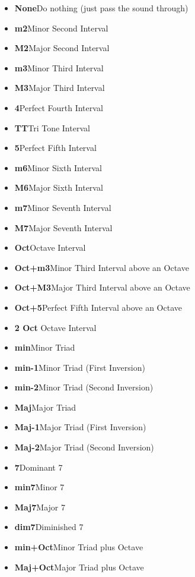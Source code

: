 \documentclass{article}
\begin{document}
{
\small
\begin{multicols}{2}
\begin{flushleft}
\begin{itemize}
\item {\bf None}\quad Do nothing (just pass the sound through)
\item {\bf m2}\quad Minor Second Interval
\item {\bf M2}\quad Major Second Interval
\item {\bf m3}\quad Minor Third Interval
\item {\bf M3}\quad Major Third Interval
\item {\bf 4}\quad Perfect Fourth Interval
\item {\bf TT}\quad Tri Tone Interval
\item {\bf 5}\quad Perfect Fifth Interval
\item {\bf m6}\quad Minor Sixth Interval
\item {\bf M6}\quad Major Sixth Interval
\item {\bf m7}\quad Minor Seventh Interval
\item {\bf M7}\quad Major Seventh Interval
\item {\bf Oct}\quad Octave Interval
\item {\bf Oct+m3}\quad Minor Third  Interval above an Octave
\item {\bf Oct+M3}\quad Major Third  Interval above an Octave
\item {\bf Oct+5}\quad Perfect Fifth  Interval above an Octave
\item {\bf 2 Oct} Octave Interval
\item {\bf min}\quad Minor Triad
\item {\bf min-1}\quad Minor Triad (First Inversion)
\item {\bf min-2}\quad Minor Triad (Second Inversion)
\item {\bf Maj}\quad Major Triad
\item {\bf Maj-1}\quad Major Triad (First Inversion)
\item {\bf Maj-2}\quad Major Triad (Second Inversion)
\item {\bf 7}\quad Dominant 7
\item {\bf min7}\quad Minor 7
\item {\bf Maj7}\quad Major 7
\item {\bf dim7}\quad Diminished 7
\item {\bf min+Oct}\quad Minor Triad plus Octave
\item {\bf Maj+Oct}\quad Major Triad plus Octave
\end{itemize}
\end{flushleft}
\end{multicols}
}
\end{document}
